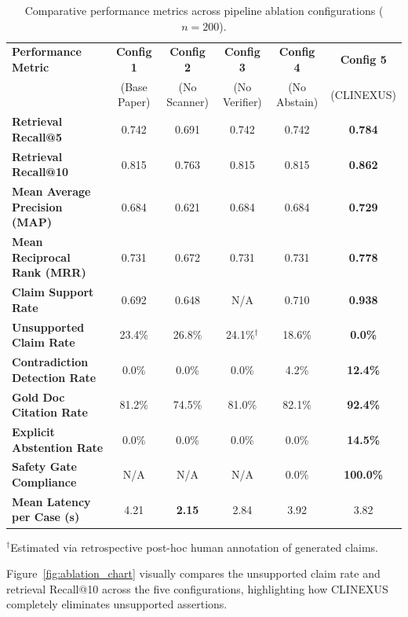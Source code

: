 \documentclass[12pt,a4paper]{report}
\begin{document}
\begin{table}[H]
\centering
\caption{Comparative performance metrics across pipeline ablation configurations ($n=200$).}
\label{tab:ablation_results}
\small
\begin{tabularx}{\textwidth}{lccccc}
\toprule
\textbf{Performance Metric} & \textbf{Config 1} & \textbf{Config 2} & \textbf{Config 3} & \textbf{Config 4} & \textbf{Config 5} \\
 & (Base Paper) & (No Scanner) & (No Verifier) & (No Abstain) & (CLINEXUS) \\
\midrule
\textbf{Retrieval Recall@5} & 0.742 & 0.691 & 0.742 & 0.742 & \textbf{0.784} \\
\textbf{Retrieval Recall@10} & 0.815 & 0.763 & 0.815 & 0.815 & \textbf{0.862} \\
\textbf{Mean Average Precision (MAP)} & 0.684 & 0.621 & 0.684 & 0.684 & \textbf{0.729} \\
\textbf{Mean Reciprocal Rank (MRR)} & 0.731 & 0.672 & 0.731 & 0.731 & \textbf{0.778} \\
\midrule
\textbf{Claim Support Rate} & 0.692 & 0.648 & N/A & 0.710 & \textbf{0.938} \\
\textbf{Unsupported Claim Rate} & 23.4\% & 26.8\% & 24.1\%$^\dagger$ & 18.6\% & \textbf{0.0\%} \\
\textbf{Contradiction Detection Rate} & 0.0\% & 0.0\% & 0.0\% & 4.2\% & \textbf{12.4\%} \\
\textbf{Gold Doc Citation Rate} & 81.2\% & 74.5\% & 81.0\% & 82.1\% & \textbf{92.4\%} \\
\midrule
\textbf{Explicit Abstention Rate} & 0.0\% & 0.0\% & 0.0\% & 0.0\% & \textbf{14.5\%} \\
\textbf{Safety Gate Compliance} & N/A & N/A & N/A & 0.0\% & \textbf{100.0\%} \\
\textbf{Mean Latency per Case (s)} & 4.21 & \textbf{2.15} & 2.84 & 3.92 & 3.82 \\
\bottomrule
\end{tabularx}
\vspace{0.1cm}
\begin{flushleft}
\scriptsize $^\dagger$Estimated via retrospective post-hoc human annotation of generated claims.
\end{flushleft}
\end{table}

Figure~\ref{fig:ablation_chart} visually compares the unsupported claim rate and retrieval Recall@10 across the five configurations, highlighting how CLINEXUS completely eliminates unsupported assertions.
\end{document}
